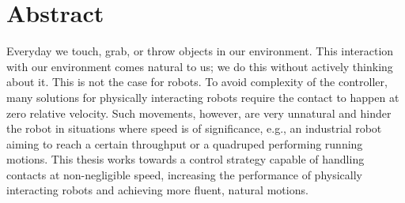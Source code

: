 \documentclass[../DC2019003Bouma.tex]{subfiles}
\begin{document}
\cleartooddpage
{}
\chapter*{Abstract}
Everyday we touch, grab, or throw objects in our environment. This interaction with our environment comes natural to us; we do this without actively thinking about it. This is not the case for robots. To avoid complexity of the controller, many solutions for physically interacting robots require the contact to happen at zero relative velocity. Such movements, however, are very unnatural and hinder the robot in situations where speed is of significance, e.g., an industrial robot aiming to reach a certain throughput or a quadruped performing running motions. This thesis works towards a control strategy capable of handling contacts at non-negligible speed, increasing the performance of physically interacting robots and achieving more fluent, natural motions.
\end{document}
